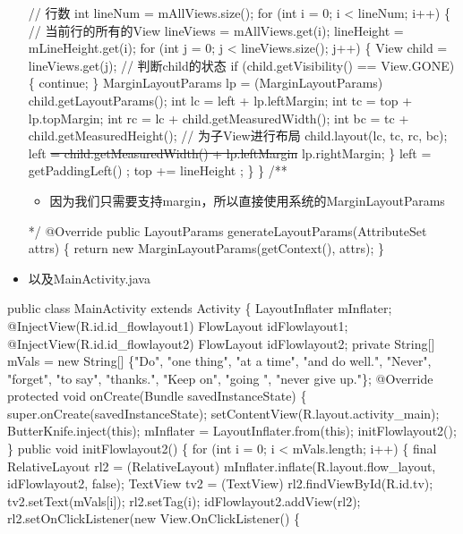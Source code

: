 \documentclass[9pt, b5paper]{article}
\begin{document}
\begin{itemize}
       // 行数
       int lineNum = mAllViews.size();
       for (int i = 0; i < lineNum; i++)
       \{
           // 当前行的所有的View
           lineViews = mAllViews.get(i);
           lineHeight = mLineHeight.get(i);
           for (int j = 0; j < lineViews.size(); j++)
           \{
               View child = lineViews.get(j);
               // 判断child的状态
               if (child.getVisibility() == View.GONE)
               \{
                   continue;
               \}
               MarginLayoutParams lp = (MarginLayoutParams) child.getLayoutParams();
               int lc = left + lp.leftMargin;
               int tc = top + lp.topMargin;
               int rc = lc + child.getMeasuredWidth();
               int bc = tc + child.getMeasuredHeight();
               // 为子View进行布局
               child.layout(lc, tc, rc, bc);
               left \sout{= child.getMeasuredWidth() + lp.leftMargin} lp.rightMargin;
           \}
           left = getPaddingLeft() ;
           top += lineHeight ;
       \}
   \}
   /**
\begin{itemize}
\item 因为我们只需要支持margin，所以直接使用系统的MarginLayoutParams
\end{itemize}
 */
@Override
public LayoutParams generateLayoutParams(AttributeSet attrs)
\{
    return new MarginLayoutParams(getContext(), attrs);
\}
\item 以及MainActivity.java
\end{itemize}
public class MainActivity extends Activity \{
    LayoutInflater mInflater;
    @InjectView(R.id.id\_flowlayout1)
    FlowLayout idFlowlayout1;
    @InjectView(R.id.id\_flowlayout2)
    FlowLayout idFlowlayout2;
    private String[] mVals = new String[]
            \{"Do", "one thing", "at a time", "and do well.", "Never", "forget",
                    "to say", "thanks.", "Keep on", "going ", "never give up."\};
    @Override
    protected void onCreate(Bundle savedInstanceState) \{
        super.onCreate(savedInstanceState);
        setContentView(R.layout.activity\_main);
        ButterKnife.inject(this);
        mInflater = LayoutInflater.from(this);
        initFlowlayout2();
    \}
    public void initFlowlayout2() \{
        for (int i = 0; i < mVals.length; i++) \{
            final RelativeLayout rl2 = (RelativeLayout) mInflater.inflate(R.layout.flow\_layout, idFlowlayout2, false);
            TextView tv2 = (TextView) rl2.findViewById(R.id.tv);
            tv2.setText(mVals[i]);
            rl2.setTag(i);
            idFlowlayout2.addView(rl2);
            rl2.setOnClickListener(new View.OnClickListener() \{
\end{document}

